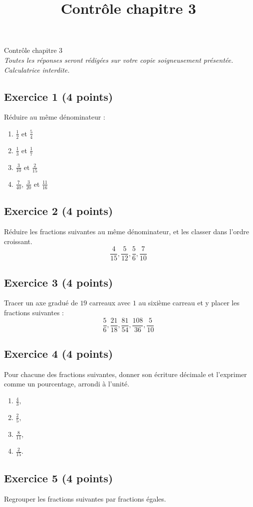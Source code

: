 \documentclass[14 pt]{extarticle}
\title{Contrôle chapitre 3}
\date{}
\theoremstyle{plain}
\begin{document}
\begin{center}{\Large Contrôle chapitre 3}\\ 
\emph{Toutes les réponses seront rédigées sur votre copie soigneusement présentée. Calculatrice interdite.}
 \end{center}
 \subsection*{Exercice 1 (4 points)}
 Réduire au même dénominateur : 
 
 \begin{enumerate}
 \item $\frac12$ et $\frac54$
 \item $\frac13$ et $\frac17$
 \item $\frac3{10}$ et $\frac2{15}$
 \item $\frac7{40}$, $\frac3{20}$ et $\frac{11}{16}$
 \end{enumerate}

\subsection*{Exercice 2 (4 points)}
Réduire les fractions suivantes au même dénominateur, et les classer dans l'ordre croissant. 
\[ \frac4{15}, \frac5{12}, \frac56, \frac7{10}\]
\subsection*{Exercice 3 (4 points)}

Tracer un axe gradué de $19$ carreaux avec $1$ au sixième carreau et y placer les fractions suivantes : 
\[ \frac56, \frac{21}{18}, \frac{81}{54}, \frac{108}{36}, \frac5{10}\]

\subsection*{Exercice 4 (4 points)}

Pour chacune des fractions suivantes, donner son écriture décimale et l'exprimer comme un pourcentage, arrondi à l'unité. 
\begin{enumerate}
\item $\frac43$,
\item $\frac25$,
\item $\frac8{11}$,
\item $\frac{2}{15}$. 
\end{enumerate}

\subsection*{Exercice 5 (4 points)}
Regrouper les fractions suivantes par fractions égales. 
\end{document}
